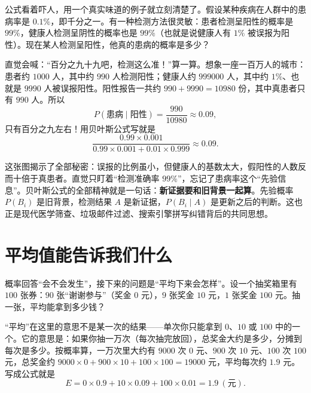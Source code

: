 公式看着吓人，用一个真实味道的例子就立刻清楚了。假设某种疾病在人群中的患病率是 $0.1\%$，即千分之一。有一种检测方法很灵敏：患者检测呈阳性的概率是 $99\%$，健康人检测呈阴性的概率也是 $99\%$（也就是说健康人有 $1\%$ 被误报为阳性）。现在某人检测呈阳性，他真的患病的概率是多少？

直觉会喊：“百分之九十九吧，检测这么准！”算一算。想象一座一百万人的城市：患者约 $1000$ 人，其中约 $990$ 人检测阳性；健康人约 $999000$ 人，其中约 $1\%$、也就是 $9990$ 人被误报阳性。阳性报告一共约 $990+9990=10980$ 份，其中真患者只有 $990$ 人。所以
\[
P(\text{患病}\mid\text{阳性})=\frac{990}{10980}\approx 0.09,
\]
只有百分之九左右！用贝叶斯公式写就是
\[
\frac{0.99\times 0.001}{0.99\times 0.001+0.01\times 0.999}\approx 0.09.
\]

\begin{center}
\end{center}

这张图揭示了全部秘密：误报的比例虽小，但健康人的基数太大，假阳性的人数反而十倍于真患者。直觉只盯着“检测准确率 $99\%$”，忘记了患病率这个“先验信息”。贝叶斯公式的全部精神就是一句话：\textbf{新证据要和旧背景一起算}。先验概率 $P(B_i)$ 是旧背景，检测结果 $A$ 是新证据，$P(B_i\mid A)$ 是更新之后的判断。这也正是现代医学筛查、垃圾邮件过滤、搜索引擎拼写纠错背后的共同思想。

\section{平均值能告诉我们什么}

概率回答“会不会发生”，接下来的问题是“平均下来会怎样”。设一个抽奖箱里有 $100$ 张券：$90$ 张“谢谢参与”（奖金 $0$ 元），$9$ 张奖金 $10$ 元，$1$ 张奖金 $100$ 元。抽一张，平均能拿到多少钱？

“平均”在这里的意思不是某一次的结果——单次你只能拿到 $0$、$10$ 或 $100$ 中的一个。它的意思是：如果你抽一万次（每次抽完放回），总奖金大约是多少，分摊到每次是多少。按概率算，一万次里大约有 $9000$ 次 $0$ 元、$900$ 次 $10$ 元、$100$ 次 $100$ 元，总奖金约 $9000\times 0+900\times 10+100\times 100=19000$ 元，平均每次约 $1.9$ 元。写成公式就是
\[
E=0\times 0.9+10\times 0.09+100\times 0.01=1.9\ (\text{元}).
\]


